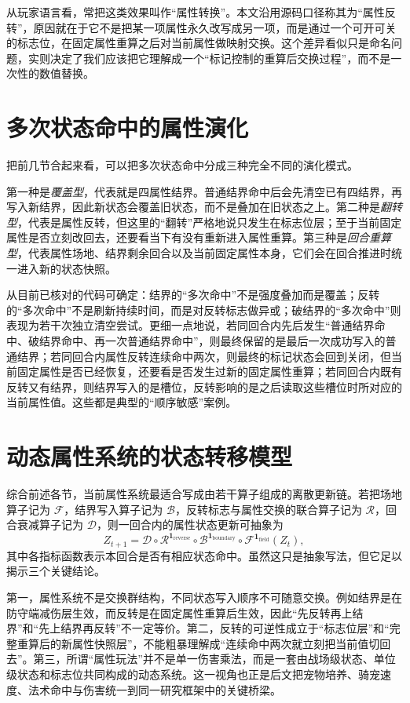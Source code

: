 从玩家语言看，常把这类效果叫作“属性转换”。本文沿用源码口径称其为“属性反转”，原因就在于它不是把某一项属性永久改写成另一项，而是通过一个可开可关的标志位，在固定属性重算之后对当前属性做映射交换。这个差异看似只是命名问题，实则决定了我们应该把它理解成一个“标记控制的重算后交换过程”，而不是一次性的数值替换。

\section{多次状态命中的属性演化}

把前几节合起来看，可以把多次状态命中分成三种完全不同的演化模式。

第一种是\emph{覆盖型}，代表就是四属性结界。普通结界命中后会先清空已有四结界，再写入新结界，因此新状态会覆盖旧状态，而不是叠加在旧状态之上。第二种是\emph{翻转型}，代表是属性反转，但这里的“翻转”严格地说只发生在标志位层；至于当前固定属性是否立刻改回去，还要看当下有没有重新进入属性重算。第三种是\emph{回合重算型}，代表属性场地、结界剩余回合以及当前固定属性本身，它们会在回合推进时统一进入新的状态快照。

从目前已核对的代码可确定：结界的“多次命中”不是强度叠加而是覆盖；反转的“多次命中”不是刷新持续时间，而是对反转标志做异或；破结界的“多次命中”则表现为若干次独立清空尝试。更细一点地说，若同回合内先后发生“普通结界命中、破结界命中、再一次普通结界命中”，则最终保留的是最后一次成功写入的普通结界；若同回合内属性反转连续命中两次，则最终的标记状态会回到关闭，但当前固定属性是否已经恢复，还要看是否发生过新的固定属性重算；若同回合内既有反转又有结界，则结界写入的是槽位，反转影响的是之后读取这些槽位时所对应的当前属性值。这些都是典型的“顺序敏感”案例。

\section{动态属性系统的状态转移模型}

综合前述各节，当前属性系统最适合写成由若干算子组成的离散更新链。若把场地算子记为 $\mathcal{F}$，结界写入算子记为 $\mathcal{B}$，反转标志与属性交换的联合算子记为 $\mathcal{R}$，回合衰减算子记为 $\mathcal{D}$，则一回合内的属性状态更新可抽象为
\begin{equation}
    Z_{t+1}
    = \mathcal{D}\circ \mathcal{R}^{\mathbf{1}_{\mathrm{reverse}}}
      \circ \mathcal{B}^{\mathbf{1}_{\mathrm{boundary}}}
      \circ \mathcal{F}^{\mathbf{1}_{\mathrm{field}}}(Z_t),
\end{equation}
其中各指标函数表示本回合是否有相应状态命中。虽然这只是抽象写法，但它足以揭示三个关键结论。

第一，属性系统不是交换群结构，不同状态写入顺序不可随意交换。例如结界是在防守端减伤层生效，而反转是在固定属性重算后生效，因此“先反转再上结界”和“先上结界再反转”不一定等价。第二，反转的可逆性成立于“标志位层”和“完整重算后的新属性快照层”，不能粗暴理解成“连续命中两次就立刻把当前值切回去”。第三，所谓“属性玩法”并不是单一伤害乘法，而是一套由战场级状态、单位级状态和标志位共同构成的动态系统。这一视角也正是后文把宠物培养、骑宠速度、法术命中与伤害统一到同一研究框架中的关键桥梁。
